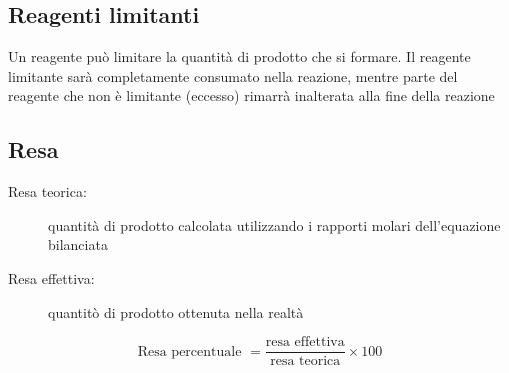 \documentclass[a4paper,11pt]{report}
\begin{document}
\subsection*{Reagenti limitanti}
Un reagente può limitare la quantità di prodotto che si formare. Il reagente limitante sarà completamente consumato nella reazione, mentre parte del reagente che non è limitante (eccesso) rimarrà inalterata alla fine della reazione 

\subsection*{Resa}
\begin{description}
	\item[Resa teorica:] quantità di prodotto calcolata utilizzando i rapporti molari dell'equazione bilanciata 
 \item[Resa effettiva:] quantitò di prodotto ottenuta nella realtà
\end{description}

\[\text{Resa percentuale } = \frac{\text{resa effettiva}}{\text{resa teorica}} \times 100 \]
\end{document}
